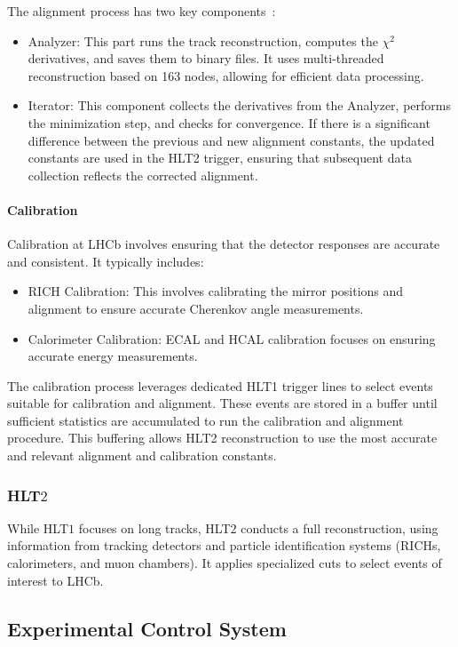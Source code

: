 The alignment process has two key components~\cite{Saur:20230E}:
\begin{itemize}
\item Analyzer: This part runs the track reconstruction, computes the $\chi^2$ derivatives, and saves them to binary files. It uses multi-threaded reconstruction based on 163 nodes, allowing for efficient data processing.
\item Iterator: This component collects the derivatives from the Analyzer, performs the minimization step, and checks for convergence. If there is a significant difference between the previous and new alignment constants, the updated constants are used in the HLT2 trigger, ensuring that subsequent data collection reflects the corrected alignment.
\end{itemize}
\paragraph{Calibration}
Calibration at LHCb involves ensuring that the detector responses are accurate and consistent. It typically includes:
\begin{itemize}
\item RICH Calibration: This involves calibrating the mirror positions and alignment to ensure accurate Cherenkov angle measurements.
\item Calorimeter Calibration: ECAL and HCAL calibration focuses on ensuring accurate energy measurements.
\end{itemize}
The calibration process leverages dedicated HLT1 trigger lines to select events suitable for calibration and alignment. These events are stored in a buffer until sufficient statistics are accumulated to run the calibration and alignment procedure. This buffering allows HLT2 reconstruction to use the most accurate and relevant alignment and calibration constants.
\subsubsection{HLT$2$}
While HLT$1$ focuses on long tracks, HLT$2$ conducts a full reconstruction, using information from tracking detectors and particle identification systems (RICHs, calorimeters, and muon chambers). It applies specialized cuts to select events of interest to LHCb.

\subsection{Experimental Control System}

